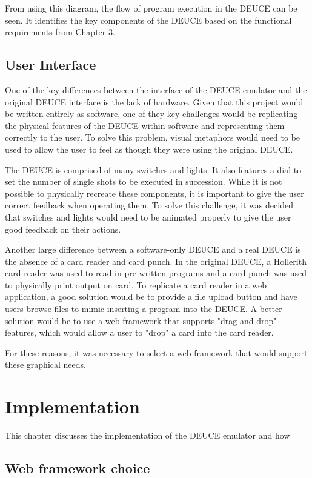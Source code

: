 \documentclass{l4proj}
\begin{document}
From using this diagram, the flow of program execution in the DEUCE can be seen. It identifies the key components of the DEUCE based on the functional requirements from Chapter 3.

\section{User Interface}
One of the key differences between the interface of the DEUCE emulator and the original DEUCE interface is the lack of hardware. Given that this project would be written entirely as software, one of they key challenges would be replicating the physical features of the DEUCE within software and representing them correctly to the user. To solve this problem, visual metaphors would need to be used to allow the user to feel as though they were using the original DEUCE.

The DEUCE is comprised of many switches and lights. It also features a dial to set the number of single shots to be executed in succession. While it is not possible to physically recreate these components, it is important to give the user correct feedback when operating them. To solve this challenge, it was decided that switches and lights would need to be animated properly to give the user good feedback on their actions.

Another large difference between a software-only DEUCE and a real DEUCE is the absence of a card reader and card punch. In the original DEUCE, a Hollerith card reader was used to read in pre-written programs and a card punch was used to physically print output on card. To replicate a card reader in a web application, a good solution would be to provide a file upload button and have users browse files to mimic inserting a program into the DEUCE. A better solution would be to use a web framework that supports "drag and drop" features, which would allow a user to "drop" a card into the card reader. 

For these reasons, it was necessary to select a web framework that would support these graphical needs.


\chapter{Implementation}
This chapter discusses the implementation of the DEUCE emulator and how 
\section{Web framework choice}
\end{document}
